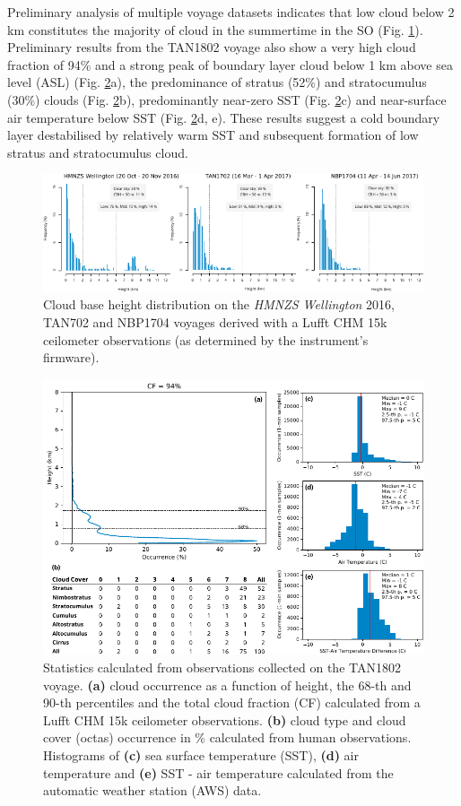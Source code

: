 Preliminary analysis of multiple voyage datasets indicates that low cloud
below 2 km constitutes the majority of cloud in the summertime in the SO
(Fig. \ref{fig:cbh}). Preliminary results from the TAN1802 voyage also
show a very high cloud fraction of 94\% and a strong peak of boundary layer
cloud below 1 km above sea level (ASL) (Fig. \ref{fig:tan1802-stats}a), the predominance
of stratus (52\%) and stratocumulus (30\%) clouds (Fig. \ref{fig:tan1802-stats}b), predominantly
near-zero SST (Fig. \ref{fig:tan1802-stats}c) and near-surface air temperature below SST
(Fig. \ref{fig:tan1802-stats}d, e). These results suggest a cold boundary layer
destabilised by relatively warm SST and subsequent formation of
low stratus and stratocumulus cloud.

\begin{figure}[t]
\includegraphics[width=\textwidth]{fig/cbh.pdf}
\caption{
Cloud base height distribution on the \textit{HMNZS Wellington} 2016, TAN702 and NBP1704
voyages derived with a Lufft CHM 15k ceilometer observations (as determined by
the instrument's firmware).
}
\label{fig:cbh}
\end{figure}

\begin{figure}[t]
\includegraphics[width=\textwidth]{fig/tan1802_stats.pdf}
\caption{
Statistics calculated from observations collected on the TAN1802 voyage.
\textbf{(a)} cloud occurrence as a function of height, the 68-th and
90-th percentiles and the total cloud fraction (CF) calculated from a Lufft CHM 15k ceilometer observations.
\textbf{(b)} cloud type and cloud cover (octas) occurrence
in \% calculated from human observations. Histograms of \textbf{(c)} sea surface temperature (SST), \textbf{(d)} air temperature
and \textbf{(e)} SST - air temperature calculated from the automatic
weather station (AWS) data.
}
\label{fig:tan1802-stats}
\end{figure}

